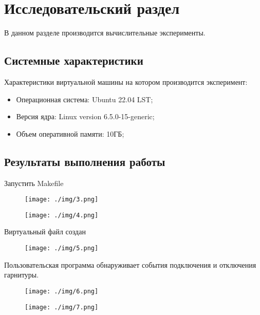 \section{Исследовательский раздел}
В данном разделе производится вычислительные эксперименты.
\subsection{Системные характеристики}
Характеристики виртуальной машины на котором производится эксперимент:

\begin{itemize}
    \item Операционная система: Ubuntu 22.04 LST;
    \item Версия ядра: Linux version 6.5.0-15-generic;
    \item Объем оперативной памяти: 10ГБ;
\end{itemize}

\subsection{Результаты выполнения работы}

Запустить Makefile

\captionsetup{justification=centering,singlelinecheck=off}
\begin{figure}[h!]
	\centering
		\texttt{[image: ./img/3.png]}
		\label{img:3}
\end{figure}

\captionsetup{justification=centering,singlelinecheck=off}
\begin{figure}[h!]
	\centering
		\texttt{[image: ./img/4.png]}
		\label{img:4}
\end{figure}
\break

Виртуальный файл создан

\captionsetup{justification=centering,singlelinecheck=off}
\begin{figure}[h!]
	\centering
		\texttt{[image: ./img/5.png]}
		\label{img:5}
\end{figure}

Пользовательская программа обнаруживает события подключения и отключения гарнитуры.

\captionsetup{justification=centering,singlelinecheck=off}
\begin{figure}[h!]
	\centering
		\texttt{[image: ./img/6.png]}
		\label{img:6}
\end{figure}

\captionsetup{justification=centering,singlelinecheck=off}
\begin{figure}[h!]
	\centering
		\texttt{[image: ./img/7.png]}
		\label{img:7}
\end{figure}